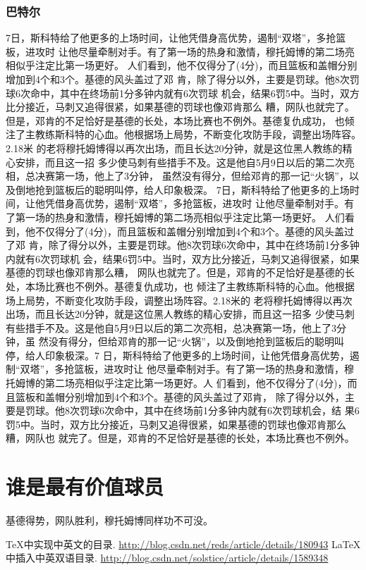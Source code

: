 \documentclass[openany]{book}
\begin{document}
\subsection{巴特尔}
7日，斯科特给了他更多的上场时间，让他凭借身高优势，遏制“双塔”，多抢篮板，进攻时
让他尽量牵制对手。有了第一场的热身和激情，穆托姆博的第二场亮相似乎注定比第一场更好。
人们看到，他不仅得分了(4分)，而且篮板和盖帽分别增加到4个和3个。基德的风头盖过了邓
肯，除了得分以外，主要是罚球。他8次罚球6次命中，其中在终场前1分多钟内就有6次罚球
机会，结果6罚5中。当时，双方比分接近，马刺又追得很紧，如果基德的罚球也像邓肯那么
糟，网队也就完了。但是，邓肯的不足恰好是基德的长处，本场比赛也不例外。基德复仇成功，
也倾注了主教练斯科特的心血。他根据场上局势，不断变化攻防手段，调整出场阵容。2.18米
的老将穆托姆博得以再次出场，而且长达20分钟，就是这位黑人教练的精心安排，而且这一招
多少使马刺有些措手不及。这是他自5月9日以后的第二次亮相，总决赛第一场，他上了3分钟，
虽然没有得分，但给邓肯的那一记“火锅”，以及倒地抢到篮板后的聪明叫停，给人印象极深。
7日，斯科特给了他更多的上场时间，让他凭借身高优势，遏制“双塔”，多抢篮板，进攻时
让他尽量牵制对手。有了第一场的热身和激情，穆托姆博的第二场亮相似乎注定比第一场更好。
人们看到，他不仅得分了(4分)，而且篮板和盖帽分别增加到4个和3个。基德的风头盖过了邓
肯，除了得分以外，主要是罚球。他8次罚球6次命中，其中在终场前1分多钟内就有6次罚球机
会，结果6罚5中。当时，双方比分接近，马刺又追得很紧，如果基德的罚球也像邓肯那么糟，
网队也就完了。但是，邓肯的不足恰好是基德的长处，本场比赛也不例外。基德复仇成功，也
倾注了主教练斯科特的心血。他根据场上局势，不断变化攻防手段，调整出场阵容。2.18米的
老将穆托姆博得以再次出场，而且长达20分钟，就是这位黑人教练的精心安排，而且这一招多
少使马刺有些措手不及。这是他自5月9日以后的第二次亮相，总决赛第一场，他上了3分钟，虽
然没有得分，但给邓肯的那一记“火锅”，以及倒地抢到篮板后的聪明叫停，给人印象极深。7
日，斯科特给了他更多的上场时间，让他凭借身高优势，遏制“双塔”，多抢篮板，进攻时让
他尽量牵制对手。有了第一场的热身和激情，穆托姆博的第二场亮相似乎注定比第一场更好。人
们看到，他不仅得分了(4分)，而且篮板和盖帽分别增加到4个和3个。基德的风头盖过了邓肯，
除了得分以外，主要是罚球。他8次罚球6次命中，其中在终场前1分多钟内就有6次罚球机会，结
果6罚5中。当时，双方比分接近，马刺又追得很紧，如果基德的罚球也像邓肯那么糟，网队也
就完了。但是，邓肯的不足恰好是基德的长处，本场比赛也不例外。
\chapter{谁是最有价值球员}
基德得势，网队胜利，穆托姆博同样功不可没。

\nocite{*}
\begin{thebibliography}{99}
 \TeX{}中实现中英文的目录. \url{http://blog.csdn.net/reds/article/details/180943}
 \LaTeX{} 中插入中英双语目录. \url{http://blog.csdn.net/solstice/article/details/1589348}
\end{thebibliography}
\end{document}
